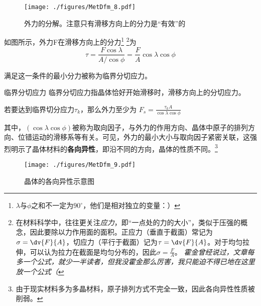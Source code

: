 \begin{figure}[ht]
\centering
\texttt{[image: ./figures/MetDfm\_8.pdf]}
\caption{外力的分解。注意只有滑移方向上的分力是“有效”的} \label{MetDfm_fig8}
\end{figure}

如图所示，外力F在滑移方向上的分力\footnote{$\lambda$与$\phi$之和不一定为$90^\circ$，他们是相对独立的变量：）} \footnote{在材料科学中，往往更关注\textsl{应力}，即“一点处的力的大小”，类似于压强的概念，因此要除以力作用面的面积。正应力（垂直于截面）常记为$\sigma=\dv{F}{A}$，切应力（平行于截面）记为$\tau=\dv{F}{A}$。对于均匀拉伸，可以认为拉力在截面是均匀分布的，因此$\sigma=\frac{F}{A}$。 \textsl{霍金曾经说过，文章每多一个公式，就少一半读者，但我没霍金那么厉害，我只能迫不得已地在这里放一个公式（}}为
\begin{equation}
\tau=\frac{F \cos \lambda}{A/{\cos \phi}}=\frac{F}{A}{\cos \lambda}{\cos \phi}
\end{equation}

满足这一条件的最小分力被称为临界分切应力。

\begin{definition}{临界分切应力}
临界分切应力指晶体恰好开始滑移时，滑移方向上的分切应力。
\end{definition}

若要达到临界切分应力$\tau_k$，那么外力至少为 $F_s=\frac{\tau_k A}{\cos \lambda \cos \phi} $ 

其中，$(\cos \lambda \cos \phi)$被称为取向因子，与外力的作用方向、晶体中原子的排列方向、位错运动的滑移系等有关。可见，外力的最小大小与取向因子紧密关联，这强烈明示了晶体材料的\textbf{各向异性}，即沿不同的方向，晶体的性质不同。\footnote{由于现实材料多为多晶材料，原子排列方式不完全一致，因此各向异性性质被削弱。}

\begin{figure}[ht]
\centering
\texttt{[image: ./figures/MetDfm\_9.pdf]}
\caption{晶体的各向异性示意图} \label{MetDfm_fig9}
\end{figure}

